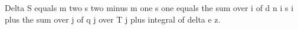 Delta S equals m two s two minus m one s one equals the sum over i of d n i s i plus the sum over j of q j over T j plus integral of delta e z.